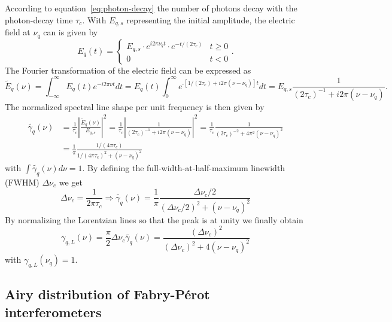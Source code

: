 According to equation~\eqref{eq:photon-decay} the number of photons decay with the photon-decay time $\tau_c$. With $E_{q,s}$ representing the initial amplitude, the electric field at $\nu_q$ can is given by
\begin{equation}
E_q(t) = 
\begin{cases}
E_{q,s} \cdot e^{i2\pi\nu_qt} \cdot e^{-t/(2\tau_c)} &  t \geq 0 \\
0 &  t < 0
\end{cases}
.
\end{equation}
The Fourier transformation of the electric field can be expressed as
\begin{equation}
\tilde{E}_q(\nu) = \int_{-\infty}^\infty E_q(t)e^{-i2\pi\nu t}dt = E_q(t) \int_{0}^\infty e^{.[1/(2\tau_c)+i2\pi(\nu-\nu_q)]t}dt = E_{q,s} \frac{1}{(2\tau_c)^{-1}+i2\pi(\nu-\nu_q)}.
\end{equation}
The normalized spectral line shape per unit frequency is then given by
\begin{align}
\label{eq:round-trip-phase-shift}
\tilde{\gamma_q}(\nu)&=\frac{1}{\tau_c}\left|\frac{\tilde{E}_q(\nu)}{E_{q,s}}\right|^2=\frac{1}{\tau_c}\left|\frac{1}{(2\tau_c)^{-1}+i2\pi(\nu-\nu_q)}\right|^2 = \frac{1}{\tau_c}\frac{1}{(2\tau_c)^{-2}+4\pi^2(\nu-\nu_q)^2} \\
&=\frac{1}{\pi}\frac{1/(4\pi\tau_c)}{1/(4\pi\tau_c)^2+(\nu-\nu_q)^2}
\end{align}
with $\int \tilde{\gamma_q}(\nu)d\nu=1$.
By defining the full-width-at-half-maximum linewidth (FWHM) $\Delta\nu_c$ we get
\begin{equation}
\Delta \nu_c = \frac{1}{2\pi\tau_c} \Rightarrow \tilde{\gamma_q}(\nu) = \frac{1}{\pi}\frac{\Delta \nu_c/2}{\left(\Delta\nu_c/2\right)^2+\left(\nu-\nu_q\right)^2}
\end{equation}
By normalizing the Lorentzian lines so that the peak is at unity we finally obtain
\begin{equation}
\label{eq:lorentzian}
\gamma_{q,L}(\nu)=\frac{\pi}{2}\Delta\nu_c\tilde{\gamma_q}(\nu)=\frac{(\Delta\nu_c)^2}{\left(\Delta \nu_c\right)^2+4\left(\nu-\nu_q\right)^2}
\end{equation}
with $\gamma_{q,L}(\nu_q)=1$.
\subsection{Airy distribution of Fabry-Pérot interferometers}

